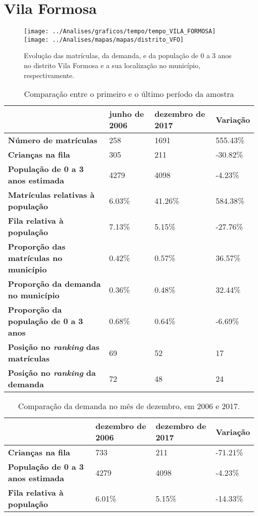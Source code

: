 \section{Vila Formosa}
\begin{figure}[H]
\centering
\texttt{[image: ../Analises/graficos/tempo/tempo\_VILA\_FORMOSA]}
\texttt{[image: ../Analises/mapas/mapas/distrito\_VFO]}
\caption{Evolução das matrículas, da demanda, e da população de 0 a 3 anos no distrito Vila Formosa e a sua localização no município, respectivamente.}
\end{figure}
\begin{table}[H]
\begin{tabular}{l|l|l|l}
\textbf{}                                      & \textbf{junho de 2006}       & \textbf{dezembro de 2017}    & \textbf{Variação} \\ \hline
\textbf{Número de matrículas}                  & 258 & 1691 & 555.43\% \\ \hline
\textbf{Crianças na fila}                      & 305 & 211 & -30.82\% \\ \hline
\textbf{População de 0 a 3 anos estimada}      & 4279 & 4098 & -4.23\% \\ \hline
\textbf{Matrículas relativas à população}      & 6.03\% & 41.26\% & 584.38\% \\ \hline
\textbf{Fila relativa à população}             & 7.13\% & 5.15\% & -27.76\% \\ \hline
\textbf{Proporção das matrículas no município} & 0.42\% & 0.57\% & 36.57\% \\ \hline
\textbf{Proporção da demanda no município}     & 0.36\% & 0.48\% & 32.44\% \\ \hline
\textbf{Proporção da população de 0 a 3 anos}  & 0.68\% & 0.64\% & -6.69\% \\ \hline
\textbf{Posição no \textit{ranking} das matrículas}     & 69 & 52 & 17 \\ \hline
\textbf{Posição no \textit{ranking} da demanda}         & 72 & 48 & 24 \\ 
\end{tabular}
\caption{Comparação entre o primeiro e o último período da amostra}
\end{table}
\begin{table}[H]
\begin{tabular}{l|l|l|l}
\textbf{}                                 & \textbf{dezembro de 2006} & \textbf{dezembro de 2017} & \textbf{Variação} \\ \hline
\textbf{Crianças na fila}                      & 733 & 211 & -71.21\% \\ \hline
\textbf{População de 0 a 3 anos estimada}      & 4279 & 4098 & -4.23\% \\ \hline
\textbf{Fila relativa à população}             & 6.01\% & 5.15\% & -14.33\% \\
\end{tabular}
\caption{Comparação da demanda no mês de dezembro, em 2006 e 2017.}
\end{table}

